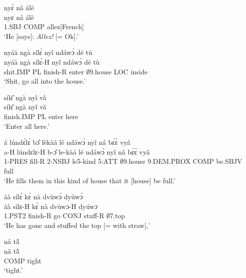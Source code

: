 \begin{exe} 
\exN\label{150}
  \glll nyɛ̀ nâ álè \\
       nyɛ nâ álè \\
       1.SBJ COMP allez[French]  \\
    \trans `He [says]: {\itshape Allez!} [= Ok].'
\end{exe}

\begin{exe} 
\exN\label{151}
  \glll nyáà ngà sílɛ́ nyî ndáwɔ̀ dé tù \\
       nyáà ngà sílɛ́-H nyî ndáwɔ̀ dé tù \\
       shit.IMP PL finish-R enter $\emptyset$9.house LOC inside  \\
    \trans `Shit, go all into the house.'
\end{exe}

\begin{exe} 
\exN\label{152}
  \glll sílɛ̂ ngà nyî vâ \\
       sílɛ̂ ngà nyî vâ \\
        finish.IMP PL enter here \\
    \trans `Enter all here.'
\end{exe}

\begin{exe} 
\exN\label{153}
  \glll á lúndɛ́lɛ́ bɔ̂ lèkàá lé ndáwɔ̀ nyî nâ bɛ́ɛ̀ vyâ \\
       a-H lúndɛlɛ-H b-ɔ̂ le-kàá lé ndáwɔ̀ nyî nâ bɛ́ɛ̀ vyâ \\
       1-PRES fill-R 2-NSBJ le5-kind 5:ATT $\emptyset$9.house 9.DEM.PROX COMP be.SBJV full \\
    \trans `He fills them in this kind of house that it [house] be full.'
\end{exe}

\begin{exe} 
\exN\label{154}
  \glll áà sílɛ́ kɛ̀ nà dvùwɔ́ dyúwɔ̀ \\
     áà sílɛ-H kɛ̀ nà dvùwɔ-H dyúwɔ \\
        1.PST2 finish-R go CONJ stuff-R $\emptyset$7.top \\
    \trans `He has gone and stuffed the top [= with straw],'
\end{exe}

\begin{exe} 
\exN\label{155} 
  \glll nâ tã̂ \\
       nâ tã̂ \\
       COMP tight  \\
    \trans `tight.'
\end{exe}

